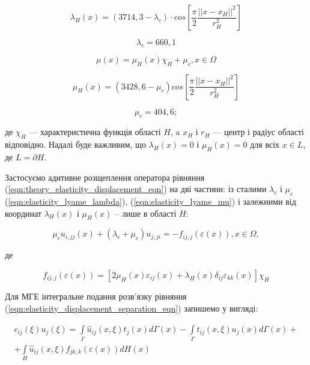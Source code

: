 \begin{equation*}
  \lambda_H(x) = (3714,3 - \lambda_c) \cdot cos\left[\frac{\pi}{2}\frac{||x-x_H||^2}{r_H^2}\right]
\end{equation*}

\begin{equation*}
  \lambda_c = 660,1
\end{equation*}

\begin{equation}
  \label{eqn:elasticity_lyame_mu}
  \mu(x) = \mu_H(x)\chi_H + \mu_c, x \in \Omega
\end{equation}

\begin{equation*}
  \mu_H(x) = (3428,6 - \mu_c)cos\left[\frac{\pi}{2}\frac{||x-x_H||^2}{r_H^2}\right]
\end{equation*}

\begin{equation*}
  \mu_c = 404,6;
\end{equation*}

\noindent де $\chi_H$ --- характеристична функція області $H$, a $x_H$ і $r_H$ --- центр і радіус області відповідно. 
Надалі буде важливим, що $\lambda_H(x) = 0$ і $\mu_H(x) = 0$ для всіх $x \in L$, де $L = \partial H$.

Застосуємо адитивне розщеплення оператора рівняння (\ref{eqn:theory_elasticity_displacement_eqn}) на дві частини: із
сталими $\lambda_c$ і $\mu_c$ (\ref{eqn:elasticity_lyame_lambda}), (\ref{eqn:elasticity_lyame_mu}) і залежними від
координат $\lambda_H(x)$ і $\mu_H(x)$ -- лише в області $H$:

\begin{equation}
  \label{eqn:elasticity_displacement_separation_eqn}
  \mu_c u_{i,jj}(x) + (\lambda_c + \mu_c)u_{j,ji} = -f_{ij,j}(\varepsilon(x)), x \in \Omega,
\end{equation}

\noindent де

\begin{equation*}
  f_{ij,j}(\varepsilon(x)) = [ 2\mu_H(x)\varepsilon_{ij}(x) + \lambda_H(x) \delta_{ij} \varepsilon_{kk}(x) ] \chi_H
\end{equation*}

Для МГЕ інтегральне подання розв'язку рівняння (\ref{eqn:elasticity_displacement_separation_eqn}) запишемо у вигляді: 

\begin{equation}
  \label{eqn:elasticity_bem_direct_elasticity}
  \begin{split}
  c_{ij}(\xi) u_j(\xi) = \int \limits_{\Gamma}\hat{u}_{ij}(x,\xi)t_j(x)d\Gamma(x) - 
      \int \limits_{\Gamma}\hat{t}_{ij}(x,\xi)u_j(x)d\Gamma(x) + \\  
      + \int \limits_H \hat{u}_{ij}(x,\xi)f_{jk,k}(\varepsilon(x))dH(x)
  \end{split}
\end{equation}

